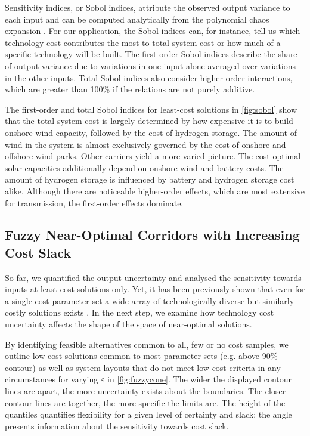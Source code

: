 Sensitivity indices, or Sobol indices, attribute the observed output variance to each input and
can be computed analytically from the polynomial chaos expansion \cite{sudret_global_2008}.
For our application, the Sobol indices can, for instance, tell us which technology cost
contributes the most to total system cost or how much of a specific technology will be built.
The first-order Sobol indices describe the share of output variance
due to variations in one input alone averaged over variations in the other inputs.
Total Sobol indices also consider higher-order interactions,
which are greater than 100\% if the relations are not purely additive.

The first-order and total Sobol indices for least-cost solutions in \cref{fig:sobol} show
that the total system cost is largely determined by how expensive it is to build onshore wind capacity,
followed by the cost of hydrogen storage. The amount of wind in the system is 
almost exclusively governed by the cost of onshore and offshore wind parks.
Other carriers yield a more varied picture.
The cost-optimal solar capacities additionally depend on onshore wind and battery costs.
The amount of hydrogen storage is influenced by battery and hydrogen storage cost alike.
Although there are noticeable higher-order effects, which are most extensive for transmission,
the first-order effects dominate.

\subsection{Fuzzy Near-Optimal Corridors with Increasing Cost Slack}

So far, we quantified the output uncertainty and analysed the sensitivity towards inputs at least-cost solutions only.
Yet, it has been previously shown that even for a single cost parameter set a wide array of
technologically diverse but similarly costly solutions exists \cite{nearoptimal}.
In the next step, we examine how technology cost uncertainty affects the shape of the space of near-optimal solutions.  

By identifying feasible alternatives common to all, few or no cost samples, we outline
low-cost solutions common to most parameter sets (e.g. above 90\% contour)
as well as system layouts that do not meet low-cost criteria in any circumstances for varying $\varepsilon$ in \cref{fig:fuzzycone}.
The wider the displayed contour lines are apart, the more uncertainty exists about the boundaries.
The closer contour lines are together, the more specific the limits are.
The height of the quantiles quantifies flexibility for a given level of certainty and slack;
the angle presents information about the sensitivity towards cost slack.

